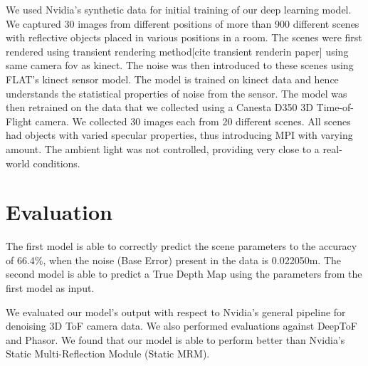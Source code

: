 \documentclass[a4paper, 11pt]{article}
\begin{document}
We used Nvidia's synthetic data for initial training of our deep learning model. We captured 30 images from different positions of more than 900 different scenes with reflective objects placed in various positions in a room. The scenes were first rendered using transient rendering method[cite transient renderin paper] using same camera fov as kinect. The noise was then introduced to these scenes using FLAT's kinect sensor model. The model is trained on kinect data and hence understands the statistical properties of noise from the sensor. The model was then retrained on the data that we collected using a Canesta D350 3D Time-of-Flight camera. We collected 30 images each from 20 different scenes. All scenes had objects with varied specular properties, thus introducing MPI with varying amount. The ambient light was not controlled, providing very close to a real-world conditions.


\section{Evaluation}

The first model is able to correctly predict the scene parameters to the accuracy of 66.4\%, when the noise (Base Error) present in the data is 0.022050m. The second model is able to predict a True Depth Map using the parameters from the first model as input.

We evaluated our model's output with respect to Nvidia's general pipeline for denoising 3D ToF camera data. We also performed evaluations against DeepToF and Phasor. We found that our model is able to perform better than Nvidia's Static Multi-Reflection Module (Static MRM). 
\end{document}
